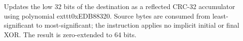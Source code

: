 Updates the low 32 bits of the destination as a reflected CRC-32 accumulator using polynomial
	exttt{0xEDB88320}. Source bytes are consumed from least-significant to most-significant; the instruction applies
no implicit initial or final XOR. The result is zero-extended to 64 bits.

